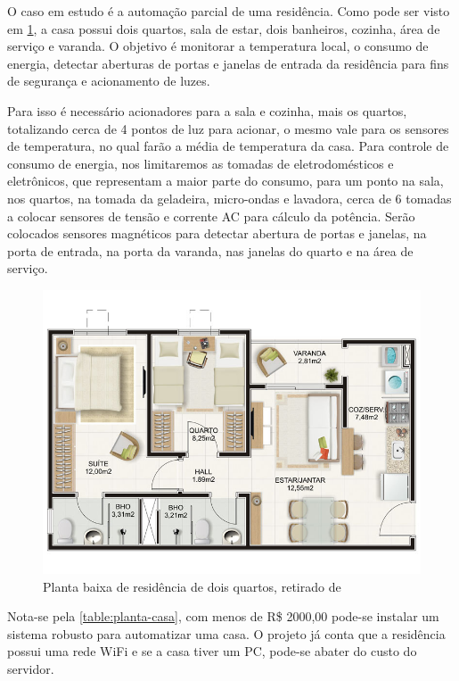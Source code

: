 O caso em estudo é a automação parcial de uma residência. Como pode ser visto em  \ref{fig:5.1.0/planta-casa}, a casa possui dois quartos, sala de estar, dois banheiros, cozinha, área de serviço e varanda. O objetivo é monitorar a temperatura local, o consumo de energia, detectar aberturas de portas e janelas de entrada da residência para fins de segurança e acionamento de luzes.

Para isso é necessário acionadores para a sala e cozinha, mais os quartos, totalizando cerca de 4 pontos de luz para acionar, o mesmo vale para os sensores de temperatura, no qual farão a média de temperatura da casa. Para controle de consumo de energia, nos limitaremos as tomadas de eletrodomésticos e eletrônicos, que representam a maior parte do consumo, para um ponto na sala, nos quartos, na tomada da geladeira, micro-ondas e lavadora, cerca de 6 tomadas a colocar sensores de tensão e corrente AC para cálculo da potência. Serão colocados sensores magnéticos para detectar abertura de portas e janelas, na porta de entrada, na porta da varanda, nas janelas do quarto e na área de serviço.

\begin{figure}[h!]
\centering
\includegraphics[width=13cm]{./02_Capitulos/02_Cap5/figures/planta-casa}
\caption{Planta baixa de residência de dois quartos, retirado de \cite{decorandocasas}}
\label{fig:5.1.0/planta-casa}
\end{figure}

Nota-se pela \ref{table:planta-casa}, com menos de R\$ 2000,00 pode-se instalar um sistema robusto para automatizar uma casa. O projeto já conta que a residência possui uma rede WiFi e se a casa tiver um PC, pode-se abater do custo do servidor.


